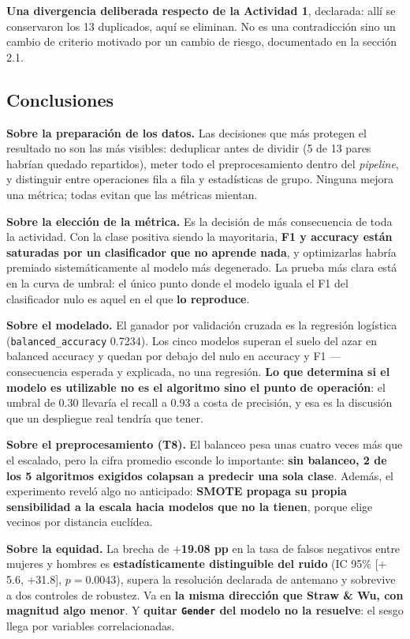 \documentclass[10pt,a4paper]{article}
\begin{document}
\textbf{Una divergencia deliberada respecto de la Actividad 1}, declarada: allí se conservaron los 13 duplicados, aquí se eliminan. No es una contradicción sino un cambio de criterio motivado por un cambio de riesgo, documentado en la sección 2.1.

\subsection{Conclusiones}

\textbf{Sobre la preparación de los datos.} Las decisiones que más protegen el resultado no son las más visibles: deduplicar antes de dividir (5 de 13 pares habrían quedado repartidos), meter todo el preprocesamiento dentro del \textit{pipeline}, y distinguir entre operaciones fila a fila y estadísticas de grupo. Ninguna mejora una métrica; todas evitan que las métricas mientan.

\textbf{Sobre la elección de la métrica.} Es la decisión de más consecuencia de toda la actividad. Con la clase positiva siendo la mayoritaria, \textbf{F1 y accuracy están saturadas por un clasificador que no aprende nada}, y optimizarlas habría premiado sistemáticamente al modelo más degenerado. La prueba más clara está en la curva de umbral: el único punto donde el modelo iguala el F1 del clasificador nulo es aquel en el que \textbf{lo reproduce}.

\textbf{Sobre el modelado.} El ganador por validación cruzada es la regresión logística (\texttt{balanced\_accuracy} 0.7234). Los cinco modelos superan el suelo del azar en balanced accuracy y quedan por debajo del nulo en accuracy y F1 --- consecuencia esperada y explicada, no una regresión. \textbf{Lo que determina si el modelo es utilizable no es el algoritmo sino el punto de operación}: el umbral de 0.30 llevaría el recall a 0.93 a costa de precisión, y esa es la discusión que un despliegue real tendría que tener.

\textbf{Sobre el preprocesamiento (T8).} El balanceo pesa unas cuatro veces más que el escalado, pero la cifra promedio esconde lo importante: \textbf{sin balanceo, 2 de los 5 algoritmos exigidos colapsan a predecir una sola clase}. Además, el experimento reveló algo no anticipado: \textbf{SMOTE propaga su propia sensibilidad a la escala hacia modelos que no la tienen}, porque elige vecinos por distancia euclídea.

\textbf{Sobre la equidad.} La brecha de \textbf{$+$19.08 pp} en la tasa de falsos negativos entre mujeres y hombres es \textbf{estadísticamente distinguible del ruido} (IC 95\% [$+$5.6, $+$31.8], $p = 0.0043$), supera la resolución declarada de antemano y sobrevive a dos controles de robustez. Va en \textbf{la misma dirección que Straw \& Wu, con magnitud algo menor}. Y \textbf{quitar \texttt{Gender} del modelo no la resuelve}: el sesgo llega por variables correlacionadas.
\end{document}
